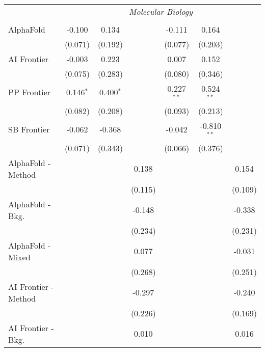 \begin{tabular}{lcccccc}
 & \multicolumn{6}{c}{\textit{Molecular Biology}} \\ \\
   AlphaFold            & -0.100      & 0.134       &             & -0.111       & 0.164         &   \\   
                        & (0.071)     & (0.192)     &             & (0.077)      & (0.203)       &   \\   
   AI Frontier          & -0.003      & 0.223       &             & 0.007        & 0.152         &   \\   
                        & (0.075)     & (0.283)     &             & (0.080)      & (0.346)       &   \\   
   PP Frontier          & 0.146$^{*}$ & 0.400$^{*}$ &             & 0.227$^{**}$ & 0.524$^{**}$  &   \\   
                        & (0.082)     & (0.208)     &             & (0.093)      & (0.213)       &   \\   
   SB Frontier          & -0.062      & -0.368      &             & -0.042       & -0.810$^{**}$ &   \\   
                        & (0.071)     & (0.343)     &             & (0.066)      & (0.376)       &   \\   
   AlphaFold - Method   &             &             & 0.138       &              &               & 0.154\\   
                        &             &             & (0.115)     &              &               & (0.109)\\   
   AlphaFold - Bkg.     &             &             & -0.148      &              &               & -0.338\\   
                        &             &             & (0.234)     &              &               & (0.231)\\   
   AlphaFold - Mixed    &             &             & 0.077       &              &               & -0.031\\   
                        &             &             & (0.268)     &              &               & (0.251)\\   
   AI Frontier - Method &             &             & -0.297      &              &               & -0.240\\   
                        &             &             & (0.226)     &              &               & (0.169)\\   
   AI Frontier - Bkg.   &             &             & 0.010       &              &               & 0.016\\   

\end{tabular}
